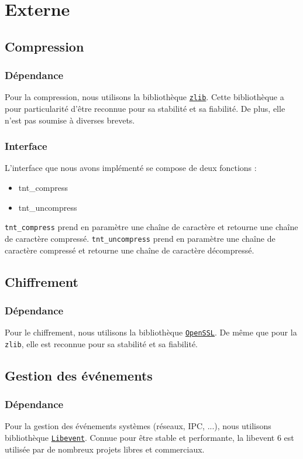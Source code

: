 \section{Externe}
\subsection{Compression}
\subsubsection{Dépendance}
Pour la compression, nous utilisons la bibliothèque \href{http://zlib.net/}{\texttt{zlib}}.
Cette bibliothèque a pour particularité d'être reconnue pour sa stabilité et sa fiabilité.
De plus, elle n'est pas soumise à diverses brevets.

\subsubsection{Interface}
L'interface que nous avons implémenté se compose de deux fonctions :
\begin{itemize}
\item tnt\_compress
\item tnt\_uncompress
\end{itemize}

\texttt{tnt\_compress} prend en paramètre une chaîne de caractère et retourne une chaîne de caractère compressé.
\texttt{tnt\_uncompress} prend en paramètre une chaîne de caractère compressé et retourne une chaîne de caractère décompressé.

\subsection{Chiffrement}
\subsubsection{Dépendance}
Pour le chiffrement, nous utilisons la bibliothèque \href{http://www.openssl.org/}{\texttt{OpenSSL}}.
De même que pour la \texttt{zlib}, elle est reconnue pour sa stabilité et sa fiabilité.


\subsection{Gestion des événements}
\subsubsection{Dépendance}
Pour la gestion des événements systèmes (réseaux, IPC, ...), nous utilisons bibliothèque \href{http://libevent.org/}{\texttt{Libevent}}.
Connue pour être stable et performante, la libevent 6 est utilisée
par de nombreux projets libres et commerciaux.
